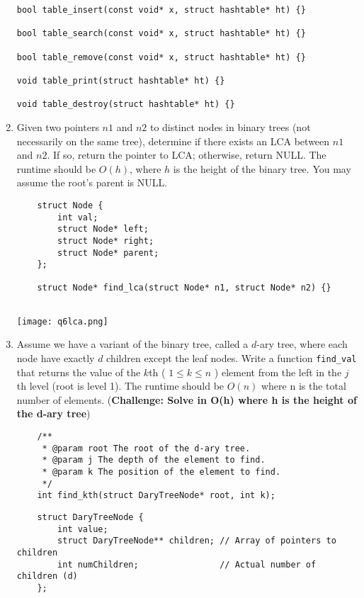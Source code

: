 \documentclass{article}
\begin{document}
\begin{enumerate}
\begin{lstlisting}
bool table_insert(const void* x, struct hashtable* ht) {}

bool table_search(const void* x, struct hashtable* ht) {}

bool table_remove(const void* x, struct hashtable* ht) {}

void table_print(struct hashtable* ht) {}

void table_destroy(struct hashtable* ht) {}
    \end{lstlisting}

    \newpage
    \item Given two pointers \( n1 \) and \( n2 \) to distinct nodes in binary trees (not necessarily on the same tree), determine if there exists an LCA between \( n1 \) and \( n2 \). If so, return the pointer to LCA; otherwise, return NULL. The runtime should be \( O(h) \), where \( h \) is the height of the binary tree. You may assume the root’s parent is NULL.

    \begin{lstlisting}
    struct Node {
        int val;
        struct Node* left;
        struct Node* right;
        struct Node* parent;
    };
     
    struct Node* find_lca(struct Node* n1, struct Node* n2) {}
 
    \end{lstlisting}


    \texttt{[image: q6lca.png]}

    \newpage
    \item Assume we have a variant of the binary tree, called a \( d \)-ary tree, where each node have exactly \( d \) children except the leaf nodes. Write a function \texttt{find\_val} that returns the value of the \( k \)th ( \( 1 \leq k \leq n \) ) element from the left in the  \( j \)th level (root is level 1). The runtime should be $O(n)$ where n is the total number of elements. (\textbf{Challenge: Solve in O(h) where h is the height of the d-ary tree})
    

    \begin{lstlisting}
    /**
     * @param root The root of the d-ary tree.
     * @param j The depth of the element to find.
     * @param k The position of the element to find.
     */
    int find_kth(struct DaryTreeNode* root, int k);
    \end{lstlisting}
    
    \begin{lstlisting}
    struct DaryTreeNode {
        int value;
        struct DaryTreeNode** children; // Array of pointers to children
        int numChildren;                // Actual number of children (d)
    };
    

\end{lstlisting}
\end{enumerate}
\end{document}
